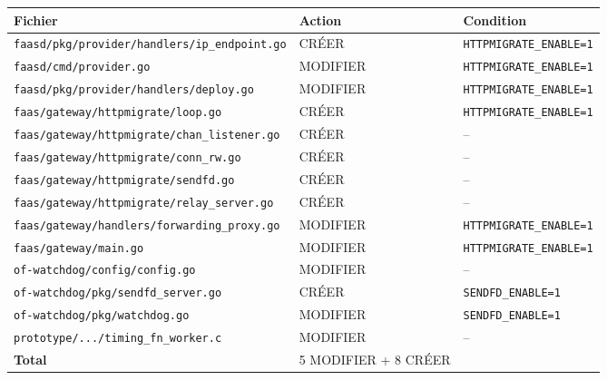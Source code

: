 \documentclass[11pt,a4paper]{article}
\begin{document}
\begin{longtable}{lll}
\toprule
\textbf{Fichier} & \textbf{Action} & \textbf{Condition} \\
\midrule
\endhead
\texttt{faasd/pkg/provider/handlers/ip\_endpoint.go} & CRÉER & \texttt{HTTPMIGRATE\_ENABLE=1} \\
\texttt{faasd/cmd/provider.go} & MODIFIER & \texttt{HTTPMIGRATE\_ENABLE=1} \\
\texttt{faasd/pkg/provider/handlers/deploy.go} & MODIFIER & \texttt{HTTPMIGRATE\_ENABLE=1} \\
\texttt{faas/gateway/httpmigrate/loop.go} & CRÉER & \texttt{HTTPMIGRATE\_ENABLE=1} \\
\texttt{faas/gateway/httpmigrate/chan\_listener.go} & CRÉER & -- \\
\texttt{faas/gateway/httpmigrate/conn\_rw.go} & CRÉER & -- \\
\texttt{faas/gateway/httpmigrate/sendfd.go} & CRÉER & -- \\
\texttt{faas/gateway/httpmigrate/relay\_server.go} & CRÉER & -- \\
\texttt{faas/gateway/handlers/forwarding\_proxy.go} & MODIFIER & \texttt{HTTPMIGRATE\_ENABLE=1} \\
\texttt{faas/gateway/main.go} & MODIFIER & \texttt{HTTPMIGRATE\_ENABLE=1} \\
\texttt{of-watchdog/config/config.go} & MODIFIER & -- \\
\texttt{of-watchdog/pkg/sendfd\_server.go} & CRÉER & \texttt{SENDFD\_ENABLE=1} \\
\texttt{of-watchdog/pkg/watchdog.go} & MODIFIER & \texttt{SENDFD\_ENABLE=1} \\
\texttt{prototype/.../timing\_fn\_worker.c} & MODIFIER & -- \\
\midrule
\textbf{Total} & 5 MODIFIER + 8 CRÉER & \\
\bottomrule
\end{longtable}
\end{document}
